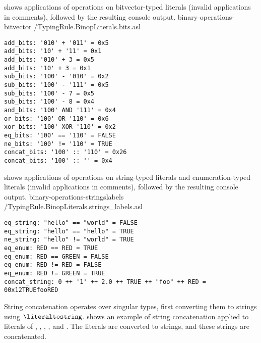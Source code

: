  shows applications
of operations on bitvector-typed literals (invalid applications in comments),
followed by the resulting console output.
  {binary-operations-bitvector}
  {\typingtests/TypingRule.BinopLiterals.bits.asl}

\begin{Verbatim}[fontsize=\footnotesize, frame=single]
add_bits: '010' + '011' = 0x5
add_bits: '10' + '11' = 0x1
add_bits: '010' + 3 = 0x5
add_bits: '10' + 3 = 0x1
sub_bits: '100' - '010' = 0x2
sub_bits: '100' - '111' = 0x5
sub_bits: '100' - 7 = 0x5
sub_bits: '100' - 8 = 0x4
and_bits: '100' AND '111' = 0x4
or_bits: '100' OR '110' = 0x6
xor_bits: '100' XOR '110' = 0x2
eq_bits: '100' == '110' = FALSE
ne_bits: '100' != '110' = TRUE
concat_bits: '100' :: '110' = 0x26
concat_bits: '100' :: '' = 0x4
\end{Verbatim}

 shows applications
of operations on string-typed literals and enumeration-typed literals (invalid applications in comments),
followed by the resulting console output.
  {binary-operations-stringslabels}
  {\typingtests/TypingRule.BinopLiterals.strings_labels.asl}

\begin{Verbatim}[fontsize=\footnotesize, frame=single]
eq_string: "hello" == "world" = FALSE
eq_string: "hello" == "hello" = TRUE
ne_string: "hello" != "world" = TRUE
eq_enum: RED == RED = TRUE
eq_enum: RED == GREEN = FALSE
eq_enum: RED != RED = FALSE
eq_enum: RED != GREEN = TRUE
concat_string: 0 ++ '1' ++ 2.0 ++ TRUE ++ "foo" ++ RED = 00x12TRUEfooRED
\end{Verbatim}

String concatenation operates over singular types, first converting them to strings using $\literaltostring$.
 shows an example of string concatenation applied to literals of \integertypeterm{}, \bitvectortypeterm{}, \realtypeterm{}, \booleantypeterm{}, and \enumerationtypeterm{}.
The literals are converted to strings, and these strings are concatenated.

